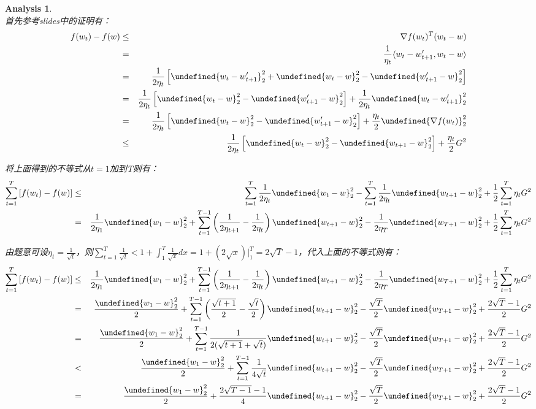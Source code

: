 \documentclass[a4paper,UTF8]{article}
\let\norm\undefined %
\DeclarePairedDelimiter\norm{\lVert}{\rVert}
\numberwithin{equation}{section}
\newtheorem*{myAnalysis}{Analysis}
\begin{document}
\begin{myAnalysis}~\\
首先参考slides中的证明有：
\begin{eqnarray*}
f(w_t) - f(w) &\le& \nabla f(w_t) ^ T (w_t - w) \\
&=& \frac{1}{\eta_t} \langle w_t - w_{t+1}', w_t - w \rangle \\
&=& \frac{1}{2\eta_t} \left[ \norm{w_t - w_{t+1}'}_2^2 + \norm{w_t - w}_2^2 - \norm{w_{t+1}' - w}_2^2 \right] \\
&=& \frac{1}{2\eta_t} \left[ \norm{w_t - w}_2^2 - \norm{w_{t+1}' - w}_2^2 \right] + \frac{1}{2\eta_t} \norm{w_t - w_{t+1}'}_2^2 \\
&=& \frac{1}{2\eta_t} \left[ \norm{w_t - w}_2^2 - \norm{w_{t+1}' - w}_2^2 \right] + \frac{\eta_t}{2} \norm{\nabla f(w_t)}_2^2 \\
&\le& \frac{1}{2\eta_t} \left[ \norm{w_t - w}_2^2 - \norm{w_{t+1} - w}_2^2 \right] + \frac{\eta_t}{2} G^2
\end{eqnarray*}

将上面得到的不等式从$t=1$加到T则有：
\begin{eqnarray*}
\sum_{t=1}^T \left[ f(w_t) - f(w) \right] &\le& \sum_{t=1}^T \frac{1}{2\eta_t} \norm{w_t - w}_2^2 - \sum_{t=1}^T \frac{1}{2\eta_t} \norm{w_{t+1} - w}_2^2 + \frac{1}{2} \sum_{t=1}^T \eta_t G^2 \\
&=& \frac{1}{2\eta_1} \norm{w_1 - w}_2^2 + \sum_{t=1}^{T - 1} \left( \frac{1}{2\eta_{t+1}} - \frac{1}{2\eta_t} \right) \norm{w_{t+1} - w}_2^2 - \frac{1}{2\eta_T}\norm{w_{T+1} - w}_2^2 + \frac{1}{2} \sum_{t=1}^T \eta_t G^2
\end{eqnarray*}

由题意可设$\eta_t = \frac{1}{\sqrt{t}}$，则$\sum_{t=1}^T \frac{1}{\sqrt{t}} < 1 + \int_1^T \frac{1}{\sqrt{x}} dx = 1 + (2\sqrt{x})|_1^T = 2\sqrt{T} - 1$，代入上面的不等式则有：
\begin{eqnarray*}
\sum_{t=1}^T \left[ f(w_t) - f(w) \right] &\le& \frac{1}{2\eta_1} \norm{w_1 - w}_2^2 + \sum_{t=1}^{T - 1} \left( \frac{1}{2\eta_{t+1}} - \frac{1}{2\eta_t} \right) \norm{w_{t+1} - w}_2^2 - \frac{1}{2\eta_T}\norm{w_{T+1} - w}_2^2 + \frac{1}{2} \sum_{t=1}^T \eta_t G^2 \\
&=& \frac{\norm{w_1 - w}_2^2}{2} + \sum_{t=1}^{T - 1} \left( \frac{\sqrt{t+1}}{2} - \frac{\sqrt{t}}{2} \right) \norm{w_{t+1} - w}_2^2 - \frac{\sqrt{T}}{2}\norm{w_{T+1} - w}_2^2 + \frac{2\sqrt{T} - 1}{2} G^2 \\
&=& \frac{\norm{w_1 - w}_2^2}{2} + \sum_{t=1}^{T - 1} \frac{1}{2(\sqrt{t+1} + \sqrt{t})}  \norm{w_{t+1} - w}_2^2 - \frac{\sqrt{T}}{2}\norm{w_{T+1} - w}_2^2 + \frac{2\sqrt{T} - 1}{2} G^2 \\
&<& \frac{\norm{w_1 - w}_2^2}{2} + \sum_{t=1}^{T - 1} \frac{1}{4\sqrt{t}}  \norm{w_{t+1} - w}_2^2 - \frac{\sqrt{T}}{2}\norm{w_{T+1} - w}_2^2 + \frac{2\sqrt{T} - 1}{2} G^2 \\
&=& \frac{\norm{w_1 - w}_2^2}{2} + \frac{2\sqrt{T-1} -1}{4}  \norm{w_{t+1} - w}_2^2 - \frac{\sqrt{T}}{2}\norm{w_{T+1} - w}_2^2 + \frac{2\sqrt{T} - 1}{2} G^2
\end{eqnarray*}


\end{myAnalysis}
\end{document}
